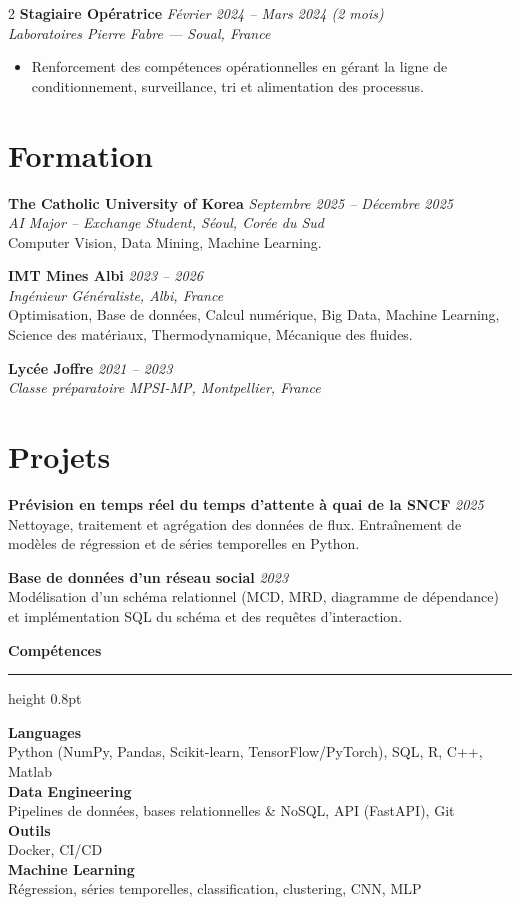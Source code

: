 \documentclass[10.5pt,a4paper]{article}
\newcommand{\sectionrule}{\vspace{-6pt}{\color{accent}\hrule height 1pt}\vspace{3pt}}
\newcommand{\subsectitle}[1]{%
  {\color{accent}\bfseries\large #1}\\[-2pt]
  {\color{accent}\hrule height 0.8pt}\vspace{4pt}
}
\newcommand{\cvexp}[5]{%
  \noindent\textbf{#1} \hfill {\itshape\color{graytext}\small #4}\\
  {\itshape #2 --- #3}\\[-2pt]
  #5
  \vspace{10pt}
}
\newcommand{\cvedu}[5]{%
  \noindent\textbf{#1} \hfill {\itshape\color{graytext}\small #4}\\
  {\itshape #2, #3}\\[1pt]
  {\small #5}
  \vspace{2pt}
}
\newcommand{\cveduplain}[4]{%
  \noindent\textbf{#1} \hfill {\itshape\color{graytext}\small #4}\\
  {\itshape #2, #3}
  \vspace{2pt}
}
\newcommand{\cvproject}[3]{%
  \noindent\textbf{#1} \hfill {\itshape\color{graytext}\small #2}\\[1pt]
  {\small #3}
  \vspace{3pt}
}
\newcommand{\sidebarline}[2]{%
  \noindent\textbf{\small #1}\\
  {\small #2}\\[3pt]
}
\begin{document}
\begin{paracol}{2}
\cvexp{Stagiaire Opératrice}{Laboratoires Pierre Fabre}{Soual, France}{Février 2024 -- Mars 2024 (2 mois)}{%
  \begin{itemize}[leftmargin=12pt, itemsep=2pt, topsep=0pt, partopsep=0pt, parsep=0pt]
    \item Renforcement des compétences opérationnelles en gérant la ligne de conditionnement, surveillance, tri et alimentation des processus.
  \end{itemize}
}

\section*{Formation}
\sectionrule

\cvedu{The Catholic University of Korea}{AI Major -- Exchange Student}{Séoul, Corée du Sud}{Septembre 2025 -- Décembre 2025}{Computer Vision, Data Mining, Machine Learning.}

\cvedu{IMT Mines Albi}{Ingénieur Généraliste}{Albi, France}{2023 -- 2026}{Optimisation, Base de données, Calcul numérique, Big Data, Machine Learning, Science des matériaux, Thermodynamique, Mécanique des fluides.}

\cveduplain{Lycée Joffre}{Classe préparatoire MPSI-MP}{Montpellier, France}{2021 -- 2023}

\section*{Projets}
\sectionrule

\cvproject{Prévision en temps réel du temps d'attente à quai de la SNCF}{2025}{Nettoyage, traitement et agrégation des données de flux. Entraînement de modèles de régression et de séries temporelles en Python.}

\cvproject{Base de données d'un réseau social}{2023}{Modélisation d'un schéma relationnel (MCD, MRD, diagramme de dépendance) et implémentation SQL du schéma et des requêtes d'interaction.}

\switchcolumn

\vspace{2pt}

\subsectitle{Compétences}

\sidebarline{Languages}{Python (NumPy, Pandas, Scikit-learn, TensorFlow/\allowbreak PyTorch), SQL, R, C++, Matlab}
\sidebarline{Data Engineering}{Pipelines de données, bases relationnelles \& NoSQL, API (FastAPI), Git}
\sidebarline{Outils}{Docker, CI/CD}
\sidebarline{Machine Learning}{Régression, séries temporelles, classification, clustering, CNN, MLP}


\end{paracol}
\end{document}
